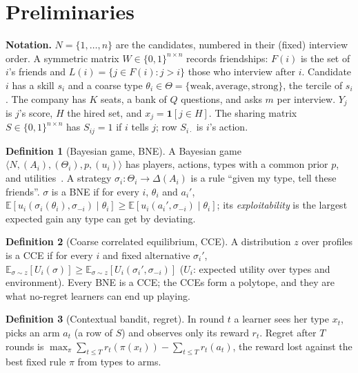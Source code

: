 \documentclass[conference]{IEEEtran}
\theoremstyle{plain}
\theoremstyle{definition}\newtheorem{definition}{Definition}
\newcommand{\E}{\mathbb{E}}\newcommand{\1}{\mathbf{1}}
\begin{document}
\section{Preliminaries}
\textbf{Notation.} $N=\{1,\dots,n\}$ are the candidates, numbered in their (fixed) interview order. A symmetric matrix
$W\in\{0,1\}^{n\times n}$ records friendships: $F(i)$ is the set of $i$'s friends and $L(i)=\{j\in F(i): j>i\}$ those who interview
after $i$. Candidate $i$ has a skill $s_i$ and a coarse type $\theta_i\in\Theta=\{\text{weak},\text{average},\text{strong}\}$, the
tercile of $s_i$. The company has $K$ seats, a bank of $Q$ questions, and asks $m$ per interview. $Y_j$ is $j$'s score, $H$ the hired
set, and $x_j=\1[j\in H]$. The sharing matrix $S\in\{0,1\}^{n\times n}$ has $S_{ij}=1$ if $i$ tells $j$; row $S_{i\cdot}$ is $i$'s action.

\begin{definition}[Bayesian game, BNE]
A Bayesian game $\langle N,(A_i),(\Theta_i),p,(u_i)\rangle$ has players, actions, types with a common prior $p$, and utilities~\cite{shoham}. A strategy
$\sigma_i:\Theta_i\to\Delta(A_i)$ is a rule ``given my type, tell these friends''. $\sigma$ is a BNE if for every $i$, $\theta_i$ and $a_i'$,
$\E[u_i(\sigma_i(\theta_i),\sigma_{-i})\mid\theta_i]\ge \E[u_i(a_i',\sigma_{-i})\mid\theta_i]$; its \emph{exploitability} is the largest expected gain any type can get by deviating.
\end{definition}
\begin{definition}[Coarse correlated equilibrium, CCE]
A distribution $z$ over profiles is a CCE if for every $i$ and fixed alternative $\sigma_i'$, $\E_{\sigma\sim z}[U_i(\sigma)]\ge\E_{\sigma\sim z}[U_i(\sigma_i',\sigma_{-i})]$
($U_i$: expected utility over types and environment). Every BNE is a CCE; the CCEs form a polytope, and they are what no-regret learners can end up playing.
\end{definition}
\begin{definition}[Contextual bandit, regret]
In round $t$ a learner sees her type $x_t$, picks an arm $a_t$ (a row of $S$) and observes only its reward $r_t$. Regret after $T$ rounds is
$\max_\pi\sum_{t\le T}r_t(\pi(x_t))-\sum_{t\le T}r_t(a_t)$, the reward lost against the best fixed rule $\pi$ from types to arms.
\end{definition}

\end{document}
